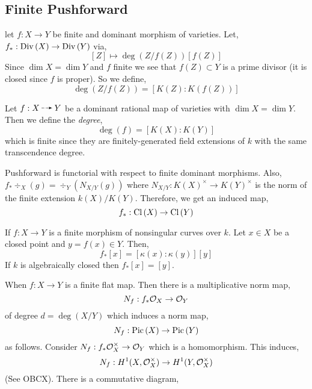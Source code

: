 \documentclass[12pt]{article}
\begin{document}
\subsection{Finite Pushforward}

let $f : X \to Y$ be finite and dominant morphism of varieties. Let, $f_* : \mathrm{Div}\left( X \right) \to \mathrm{Div}\left( Y \right)$ via,
\[ [Z] \mapsto \deg{(Z/f(Z))} [f(Z)] \]
Since $\dim{X} = \dim{Y}$ and $f$ finite  we see that $f(Z) \subset Y$ is a prime divisor (it is closed since $f$ is proper). So we define,
\[ \deg{(Z/f(Z))} = [K(Z) : K(f(Z))] \]

\begin{defn}
Let $f : X \rat Y$ be a dominant rational map of varieties with $\dim{X} = \dim{Y}$. Then we define the \textit{degree},
\[ \deg{(f)} = [K(X) : K(Y)] \]
which is finite since they are finitely-generated field extensions of $k$ with the same transcendence degree.  
\end{defn}

\begin{prop}
Pushforward is functorial with respect to finite dominant morphisms. Also,
$f_* \div_X(g) = \div_Y(N_{X/Y}(g))$
where $N_{X/Y} : K(X)^\times \to K(Y)^\times$ is the norm of the finite extension $k(X)/K(Y)$. Therefore, we get an induced map,
\[ f_* : \mathrm{Cl} \left( X \right) \to \mathrm{Cl} \left( Y \right) \]
\end{prop}

\begin{example}
If $f : X \to Y$ is a finite morphism of nonsingular curves over $k$. Let $x \in X$ be a closed point and $y = f(x) \in Y$. Then,
\[ f_*[x] = [\kappa(x) : \kappa(y)] [y] \]
If $k$ is algebraically closed then $f_*[x] = [y]$. 
\end{example}

When $f : X \to Y$ is a finite flat map. Then there is a multiplicative norm map,
\[ N_f : f_* \mathcal{O}_{X} \to \mathcal{O}_{Y} \]
of degree $d = \deg{(X/Y)}$ which induces a norm map,
\[ N_f : \mathrm{Pic} \left( X \right) \to \mathrm{Pic} \left( Y \right) \]
as follows. Consider $N_f : f_* \mathcal{O}_{X}^\times \to \mathcal{O}_{Y}$ which is a homomorphism. This induces,
\[ N_f : H^1(X, \mathcal{O}_{X}^\times) \to H^1(Y, \mathcal{O}_{X}^\times) \]
(See OBCX). There is a commutative diagram,
\begin{center}
\end{center}
\end{document}
